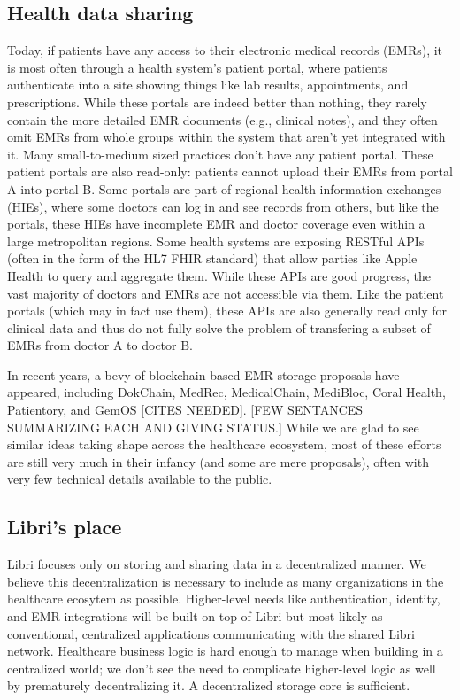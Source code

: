 \documentclass[10pt]{article}
\begin{document}
\subsection{Health data sharing}
Today, if patients have any access to their electronic medical records (EMRs), it is most often through a health system's patient portal, where patients authenticate into a site showing things like lab results, appointments, and prescriptions. While these portals are indeed better than nothing, they rarely contain the more detailed EMR documents (e.g., clinical notes), and they often omit EMRs from whole groups within the system that aren't yet integrated with it. Many small-to-medium sized practices don't have any patient portal. These patient portals are also read-only: patients cannot upload their EMRs from portal A into portal B. Some portals are part of regional health information exchanges (HIEs), where some doctors can log in and see records from others, but like the portals, these HIEs have incomplete EMR and doctor coverage even within a large metropolitan regions. Some health systems are exposing RESTful APIs (often in the form of the HL7 FHIR standard) that allow  parties like Apple Health to query and aggregate them. While these APIs are good progress, the vast majority of doctors and EMRs are not accessible via them. Like the patient portals (which may in fact use them), these APIs are also generally read only for clinical data and thus do not fully solve the problem of transfering a subset of EMRs from doctor A to doctor B.

In recent years, a bevy of blockchain-based EMR storage proposals have appeared, including DokChain, MedRec, MedicalChain, MediBloc, Coral Health, Patientory, and GemOS [CITES NEEDED]. [FEW SENTANCES SUMMARIZING EACH AND GIVING STATUS.] While we are glad to see similar ideas taking shape across the healthcare ecosystem, most of these efforts are still very much in their infancy (and some are mere proposals), often with very few technical details available to the public. 

\subsection{Libri's place}
Libri focuses only on storing and sharing data in a decentralized manner. We believe this decentralization is necessary to include as many organizations in the healthcare ecosytem as possible. Higher-level needs like authentication, identity, and EMR-integrations will be built on top of Libri but most likely as conventional, centralized applications communicating with the shared Libri network. Healthcare business logic is hard enough to manage when building in a centralized world; we don't see the need to complicate higher-level logic as well by prematurely decentralizing it. A decentralized storage core is sufficient.
\end{document}
